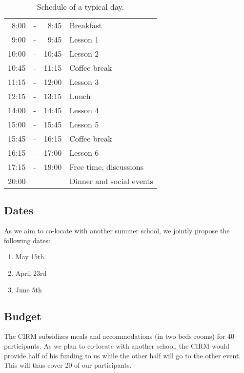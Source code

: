 \documentclass[a4paper]{scrartcl}
\begin{document}
\begin{table}[ht]
	\centering
	\begin{tabular}{rcrl}
	 8:00 & - &  8:45 & Breakfast \\
	 9:00 & - &  9:45 & Lesson 1 \\
	10:00 & - & 10:45 & Lesson 2 \\
	10:45 & - & 11:15 & Coffee break \\
	11:15 & - & 12:00 & Lesson 3 \\
	12:15 & - & 13:15 & Lunch \\
	14:00 & - & 14:45 & Lesson 4 \\
	15:00 & - & 15:45 & Lesson 5 \\
	15:45 & - & 16:15 & Coffee break \\
	16:15 & - & 17:00 & Lesson 6 \\
	17:15 & - & 19:00 & Free time, discussions \\
	20:00 &   &       &  Dinner and social events
	\end{tabular}
	\caption{Schedule of a typical day.}
	\label{schedule}
\end{table}

\subsection{Dates}

As we aim to co-locate with another summer school, we jointly propose the
following dates:
\begin{enumerate}
	\setlength{\itemsep}{0pt} \setlength{\parskip}{0pt}
	\item May 15th
	\item April 23rd
	\item June 5th
\end{enumerate}

\subsection{Budget}

The CIRM subsidizes meals and accommodations (in two beds rooms) for 40
participants. As we plan to co-locate with another school, the CIRM would
provide half of his funding to us while the other half will go to the other
event. This will thus cover 20 of our participants.
\end{document}
